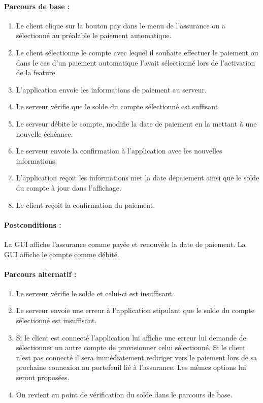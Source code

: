 \documentclass[../annexe.tex]{subfiles}
\begin{document}
\paragraph{Parcours de base :}
		\begin{enumerate}
				\item Le client clique sur la bouton pay dans le menu de l'assurance ou a sélectionné au préalable le paiement automatique.
				\item Le client sélectionne le compte avec lequel il souhaite effectuer le paiement ou dans le cas d'un paiement automatique l'avait sélectionné
						lors de l'activation de la feature.
				\item L'application envoie les informations de paiement au serveur.
				\item Le serveur vérifie que le solde du compte sélectionné est suffisant.
				\item Le serveur débite le compte, modifie la date de paiement en la mettant à une nouvelle échéance.
				\item Le serveur envoie la confirmation à l'application avec les nouvelles informations.
				\item L'application reçoit les informations met la date depaiement ainsi que le solde du compte à jour dans l'affichage.
				\item Le client reçoit la confirmation du paiement.
		\end{enumerate}
\paragraph{Postconditions :}
		La GUI affiche l'assurance comme payée et renouvèle la date de paiement. La GUI affiche le compte comme débité.

\paragraph{Parcours alternatif :}
		\begin{enumerate}
				\item Le serveur vérifie le solde et celui-ci est insuffisant.
				\item Le serveur envoie une erreur à l'application stipulant que le solde du compte sélectionné est insuffisant.
				\item Si le client est connecté l'application lui affiche une erreur lui demande de sélectionner un autre compte de provisionner celui sélectionné.
						Si le client n'est pas connecté il sera immédiatement rediriger vers le paiement lors de sa prochaine connexion au portefeuil lié à 
						l'assurance. Les mêmes options lui seront proposées.
				\item On revient au point de vérification du solde dans le parcours de base.		
		\end{enumerate}
\end{document}
